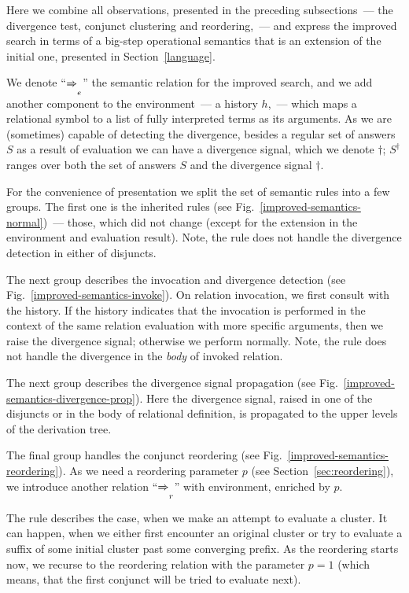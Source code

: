 Here we combine all observations, presented in the preceding subsections~--- the divergence test, conjunct clustering
and reordering,~--- and express the improved search in terms of a big-step operational semantics that is an extension
of the initial one, presented in Section~\ref{language}.

We denote ``$\xRightarrow{}_e$'' the semantic relation for the improved search, and we add another component to the
environment~--- a history $h$,~--- which maps a relational symbol to a list of fully interpreted terms as its arguments.
As we are (sometimes) capable of detecting the divergence, besides a regular set of answers $S$ as a result of evaluation
we can have a divergence signal, which we denote $\dagger$; $S^\dagger$ ranges over both the set of answers $S$ and the divergence
signal $\dagger$.

For the convenience of presentation we split the set of semantic rules into a few groups. The first one is the inherited
rules (see Fig.~\ref{improved-semantics-normal})~--- those, which did not change (except for the extension in the
environment and evaluation result). Note, the rule  does not handle the divergence detection
in either of disjuncts.

The next group describes the invocation and divergence detection (see Fig.~\ref{improved-semantics-invoke}). On
relation invocation, we first consult with the history. If the history indicates that the invocation is performed in the
context of the same relation evaluation with more specific arguments, then we raise the divergence signal; otherwise
we perform normally. Note, the rule  does not handle the divergence in the \emph{body} of
invoked relation.

The next group describes the divergence signal propagation (see Fig.~\ref{improved-semantics-divergence-prop}). Here
the divergence signal, raised in one of the disjuncts or in the body of relational definition, is propagated to the upper
levels of the derivation tree.

The final group handles the conjunct reordering (see Fig.~\ref{improved-semantics-reordering}). As we need a reordering
parameter $p$ (see Section~\ref{sec:reordering}), we introduce another relation ``$\xRightarrow{}_r$'' with environment,
enriched by $p$.

The rule  describes the case, when we make an attempt to evaluate a cluster. It can happen, when
we either first encounter an original cluster or try to evaluate a suffix of some initial cluster past some converging
prefix. As the reordering starts now, we recurse to the reordering relation with the parameter \mbox{$p=1$} (which means,
that the first conjunct will be tried to evaluate next).

